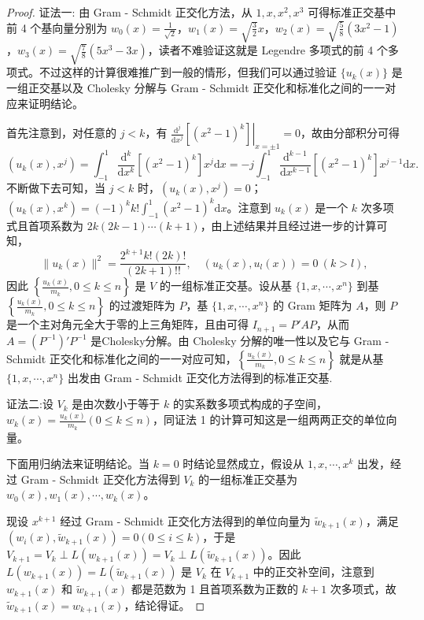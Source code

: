 \documentclass[../../main.tex]{subfiles}
\begin{document}
\begin{proof}
{\color{blue}证法一:}
由 Gram - Schmidt 正交化方法，从 $1,x,x^2,x^3$ 可得标准正交基中前 4 个基向量分别为 $w_0(x)=\frac{1}{\sqrt{2}}$，$w_1(x)=\sqrt{\frac{3}{2}}x$，$w_2(x)=\sqrt{\frac{5}{8}}(3x^2 - 1)$，$w_3(x)=\sqrt{\frac{7}{8}}(5x^3 - 3x)$，读者不难验证这就是 Legendre 多项式的前 4 个多项式。不过这样的计算很难推广到一般的情形，但我们可以通过验证 $\{u_k(x)\}$ 是一组正交基以及 Cholesky 分解与 Gram - Schmidt 正交化和标准化之间的一一对应来证明结论。

首先注意到，对任意的 $j < k$，有 $\left.\frac{\mathrm{d}^j}{\mathrm{d}x^j}[(x^2 - 1)^k]\right|_{x = \pm1}=0$，故由分部积分可得
\[
(u_k(x),x^j)=\int_{-1}^{1}\frac{\mathrm{d}^k}{\mathrm{d}x^k}[(x^2 - 1)^k]x^j\mathrm{d}x=-j\int_{-1}^{1}\frac{\mathrm{d}^{k - 1}}{\mathrm{d}x^{k - 1}}[(x^2 - 1)^k]x^{j - 1}\mathrm{d}x.
\]
不断做下去可知，当 $j < k$ 时，$(u_k(x),x^j)=0$；$(u_k(x),x^k)=(-1)^kk!\int_{-1}^{1}(x^2 - 1)^k\mathrm{d}x$。注意到 $u_k(x)$ 是一个 $k$ 次多项式且首项系数为 $2k(2k - 1)\cdots(k + 1)$，由上述结果并且经过进一步的计算可知，
\[
\|u_k(x)\|^2=\frac{2^{k + 1}k!(2k)!}{(2k + 1)!!},\quad (u_k(x),u_l(x))=0\ (k > l),
\]
因此 $\left\{\frac{u_k(x)}{m_k},0\leq k\leq n\right\}$ 是 $V$ 的一组标准正交基。设从基 $\{1,x,\cdots,x^n\}$ 到基 $\left\{\frac{u_k(x)}{m_k},0\leq k\leq n\right\}$ 的过渡矩阵为 $P$，基 $\{1,x,\cdots,x^n\}$ 的 Gram 矩阵为 $A$，则 $P$ 是一个主对角元全大于零的上三角矩阵，且由可得 $I_{n + 1}=P'AP$，从而 $A=(P^{-1})'P^{-1}$ 是Cholesky分解。由 Cholesky 分解的唯一性以及它与 Gram - Schmidt 正交化和标准化之间的一一对应可知，$\left\{\frac{u_k(x)}{m_k},0\leq k\leq n\right\}$ 就是从基 $\{1,x,\cdots,x^n\}$ 出发由 Gram - Schmidt 正交化方法得到的标准正交基.

{\color{blue}证法二:}设 $V_k$ 是由次数小于等于 $k$ 的实系数多项式构成的子空间，$w_k(x) = \frac{u_k(x)}{m_k} (0 \leq k \leq n)$，同证法 1 的计算可知这是一组两两正交的单位向量。

下面用归纳法来证明结论。当 $k = 0$ 时结论显然成立，假设从 $1, x, \cdots, x^k$ 出发，经过 Gram - Schmidt 正交化方法得到 $V_k$ 的一组标准正交基为 $w_0(x), w_1(x), \cdots, w_k(x)$。

现设 $x^{k + 1}$ 经过 Gram - Schmidt 正交化方法得到的单位向量为 $\widetilde{w}_{k + 1}(x)$，满足 $(w_i(x), \widetilde{w}_{k + 1}(x)) = 0 (0 \leq i \leq k)$，于是 $V_{k + 1} = V_k \perp L(w_{k + 1}(x)) = V_k \perp L(\widetilde{w}_{k + 1}(x))$。因此 $L(w_{k + 1}(x)) = L(\widetilde{w}_{k + 1}(x))$ 是 $V_k$ 在 $V_{k + 1}$ 中的正交补空间，注意到 $w_{k + 1}(x)$ 和 $\widetilde{w}_{k + 1}(x)$ 都是范数为 1 且首项系数为正数的 $k + 1$ 次多项式，故 $\widetilde{w}_{k + 1}(x) = w_{k + 1}(x)$，结论得证。
\end{proof}
\end{document}
